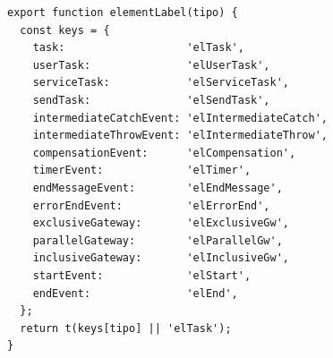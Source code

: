 \begin{lstlisting}[style=promptbox]
export function elementLabel(tipo) {
  const keys = {
    task:                   'elTask',
    userTask:               'elUserTask',
    serviceTask:            'elServiceTask',
    sendTask:               'elSendTask',
    intermediateCatchEvent: 'elIntermediateCatch',
    intermediateThrowEvent: 'elIntermediateThrow',
    compensationEvent:      'elCompensation',
    timerEvent:             'elTimer',
    endMessageEvent:        'elEndMessage',
    errorEndEvent:          'elErrorEnd',
    exclusiveGateway:       'elExclusiveGw',
    parallelGateway:        'elParallelGw',
    inclusiveGateway:       'elInclusiveGw',
    startEvent:             'elStart',
    endEvent:               'elEnd',
  };
  return t(keys[tipo] || 'elTask');
}
\end{lstlisting}

